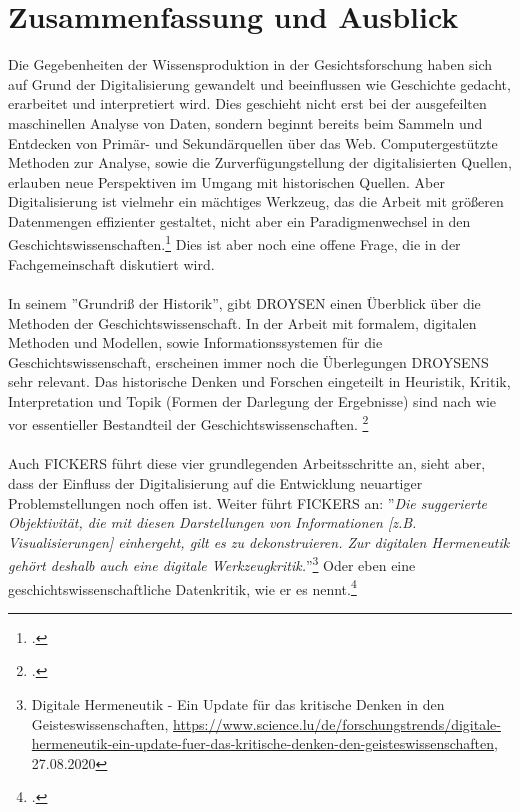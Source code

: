 \documentclass[12pt,a4paper]{article}
\begin{document}
\newpage
\section{Zusammenfassung und Ausblick}

Die Gegebenheiten der Wissensproduktion in der Gesichtsforschung haben sich auf Grund der Digitalisierung gewandelt und beeinflussen wie Geschichte gedacht, erarbeitet und interpretiert wird. Dies geschieht nicht erst bei der ausgefeilten maschinellen Analyse von Daten, sondern beginnt bereits beim Sammeln und Entdecken von Primär- und Sekundärquellen über das Web. Computergestützte Methoden zur Analyse, sowie die Zurverfügungstellung der digitalisierten Quellen, erlauben neue Perspektiven im Umgang mit historischen Quellen. Aber Digitalisierung ist vielmehr ein mächtiges Werkzeug, das die Arbeit mit größeren Datenmengen effizienter gestaltet, nicht aber ein Paradigmenwechsel in den Geschichtswissenschaften.\footcite[][]{koenig2020archive} Dies ist aber noch eine offene Frage, die in der Fachgemeinschaft diskutiert wird. 
\\
\\
In seinem ''Grundriß der Historik'', gibt DROYSEN einen Überblick über die Methoden der Geschichtswissenschaft. In der Arbeit mit formalem, digitalen Methoden und Modellen, sowie Informationssystemen für die Geschichtswissenschaft, erscheinen immer noch die Überlegungen DROYSENS sehr relevant. Das historische Denken und Forschen eingeteilt in Heuristik, Kritik, Interpretation und Topik (Formen der Darlegung der Ergebnisse) sind nach wie vor essentieller Bestandteil der Geschichtswissenschaften. \footcite[][S.85-116]{hardtwig1990studium}
\\
\\
Auch FICKERS führt diese vier grundlegenden Arbeitsschritte an, sieht aber, dass der Einfluss der Digitalisierung auf die Entwicklung neuartiger Problemstellungen noch offen ist. Weiter führt FICKERS an: ''\textit{Die suggerierte Objektivität, die mit diesen Darstellungen von Informationen [z.B.  Visualisierungen] einhergeht, gilt es zu dekonstruieren. Zur digitalen Hermeneutik gehört deshalb auch eine digitale Werkzeugkritik.}''\footnote{Digitale Hermeneutik - Ein Update für das kritische Denken in den Geisteswissenschaften, \url{https://www.science.lu/de/forschungstrends/digitale-hermeneutik-ein-update-fuer-das-kritische-denken-den-geisteswissenschaften}, 27.08.2020} 
Oder eben eine geschichtswissenschaftliche Datenkritik, wie er es nennt.\footcite[][S.2]{fickers2020update}
\end{document}
